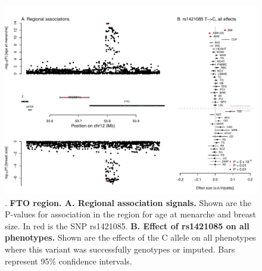 \documentclass[11pt,titlepage]{article}
\begin{document}
\begin{figure}
\begin{center}
\includegraphics[scale = 0.6]{figs/FTO_region.pdf}
\caption{. \textbf{FTO region. A. Regional association signals.} Shown are the P-values for association in the region for age at menarche and breast size. In red is the SNP rs1421085. \textbf{B. Effect of rs1421085 on all phenotypes.} Shown are the effects of the C allele on all phenotypes where this variant was successfully genotypes or imputed. Bars represent 95\% confidence intervals.}\label{f_apoe}
\end{center}
\end{figure}
\end{document}
